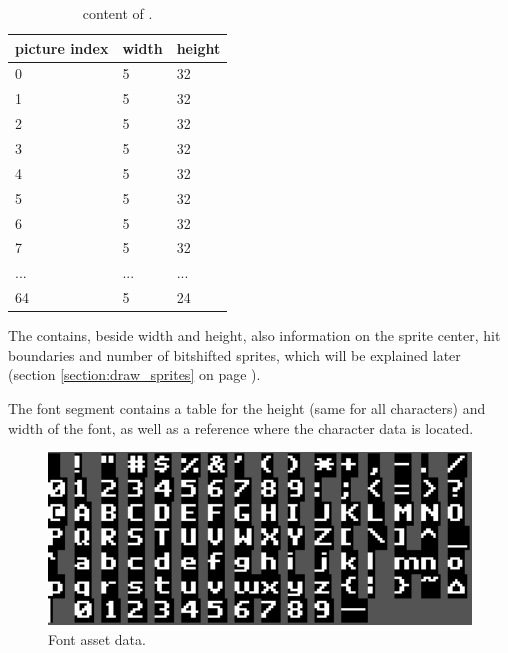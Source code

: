 \documentclass[book.tex]{subfiles}
\begin{document}
  \begin{table}[H]
  \begin{tabularx}{0.8\textwidth}[c]{XXX}
  \hline
  \textbf{picture index} & \textbf{width} & \textbf{height}   \\ \hline
  0             & 5          & 32    \\
  1             & 5          & 32    \\
  2             & 5          & 32    \\
  3             & 5          & 32    \\
  4             & 5          & 32    \\
  5             & 5          & 32    \\
  6             & 5          & 32    \\
  7             & 5          & 32    \\
  ...             & ...          & ...    \\
  64             & 5          & 24    \\
  \end{tabularx}
  \caption{content of .}
  \end{table}



The  contains, beside width and height, also information on the sprite center, hit boundaries and number of bitshifted sprites, which will be explained later (section \ref{section:draw_sprites} on page \pageref{section:draw_sprites}). \\
\par


The font segment contains a table for the height (same for all characters) and width of the font, as well as a reference where the character data is located.\\
\par
\begin{minipage}{\textwidth}
 \par
 \end{minipage}
\begin{figure}[H] 
  \centering 
  \includegraphics[width=1.0\textwidth, frame]{screenshots_300dpi/font.png}
  \caption{Font asset data.}
  \label{fig:font_assets}
\end{figure} 
\end{document}
